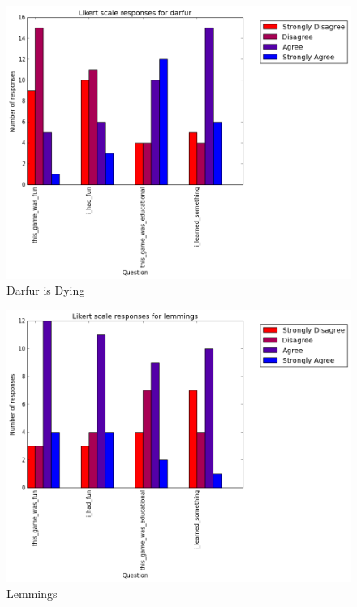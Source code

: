 			\begin{figure}[] 
			\centering 
			\includegraphics[width=\textwidth]{darfur_likert.png} 
			\caption{Darfur is Dying}
			\end{figure}

			\begin{figure}[] 
			\centering 
			\includegraphics[width=\textwidth]{lemmings_likert.png} 
			\caption{Lemmings}
			\end{figure}


